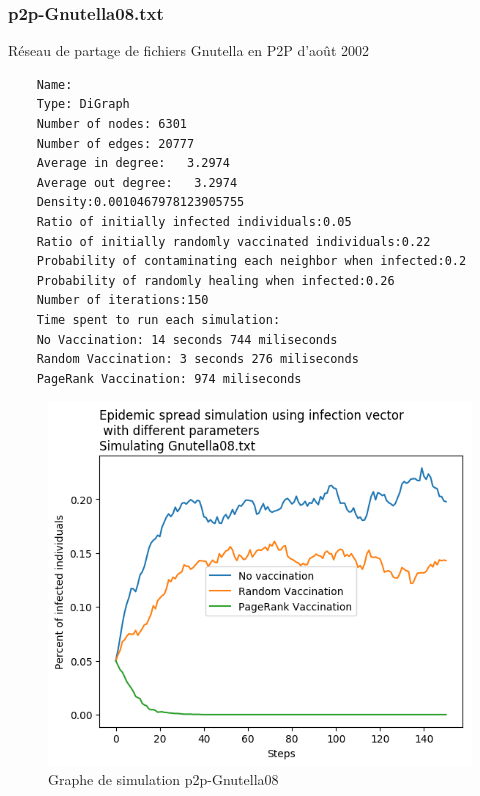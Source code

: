 \documentclass{report}
\begin{document}
\subsubsection{p2p-Gnutella08.txt}
Réseau de partage de fichiers Gnutella en P2P d'août 2002
\begin{tcolorbox}
  \begin{verbatim}
    Name:
    Type: DiGraph
    Number of nodes: 6301
    Number of edges: 20777
    Average in degree:   3.2974
    Average out degree:   3.2974
    Density:0.0010467978123905755
    Ratio of initially infected individuals:0.05
    Ratio of initially randomly vaccinated individuals:0.22
    Probability of contaminating each neighbor when infected:0.2
    Probability of randomly healing when infected:0.26
    Number of iterations:150
    Time spent to run each simulation:
    No Vaccination: 14 seconds 744 miliseconds
    Random Vaccination: 3 seconds 276 miliseconds
    PageRank Vaccination: 974 miliseconds
  \end{verbatim}
\end{tcolorbox}
\begin{figure}[ht!]
  \centering
  \includegraphics[scale=0.7]{../plots/Gnutella08.png}
  \caption{Graphe de simulation p2p-Gnutella08}
\end{figure}
\newpage
\end{document}
